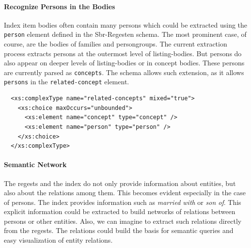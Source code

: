 \paragraph{Recognize Persons in the Bodies}
Index item bodies often contain many persons which could be extracted using the \texttt{person} element defined in the Sbr-Regesten schema. The most prominent case, of course, are the bodies of families and persongroups. The current extraction process extracts persons at the outermost level of listing-bodies. But persons do also appear on deeper levels of listing-bodies or in concept bodies. These persons are currently parsed as \texttt{concepts}. The schema allows such extension, as it allows \texttt{persons} in the \texttt{related-concept} element.

\begin{verbatim}
  <xs:complexType name="related-concepts" mixed="true">
    <xs:choice maxOccurs="unbounded">
      <xs:element name="concept" type="concept" />
      <xs:element name="person" type="person" />
    </xs:choice>
  </xs:complexType>
\end{verbatim}

\paragraph{Semantic Network}
The regests and the index do not only provide information about entities, but also about the relations among them. This becomes evident especially in the case of persons. The index provides information such as \textit{married with} or \textit{son of}. This explicit information could be extracted to build networks of relations between persons or other entities. Also, we can imagine to extract such relations directly from the regests. The relations could build the basis for semantic queries and easy visualization of entity relations.
